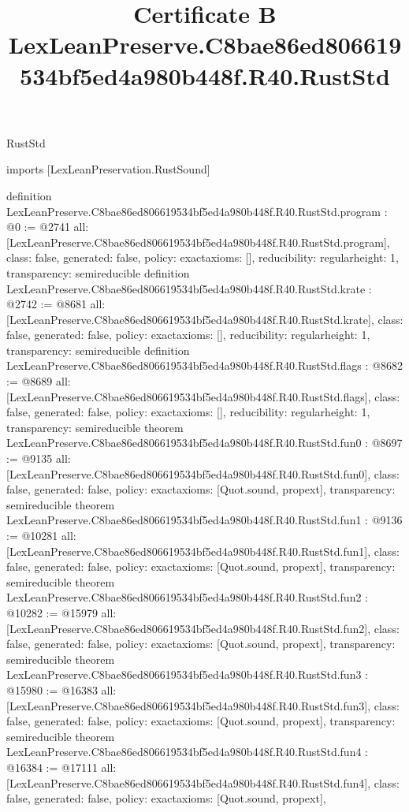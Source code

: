 \begin{lexlean}{RustStd}
\title{Certificate B LexLeanPreserve.C8bae86ed806619534bf5ed4a980b448f.R40.RustStd}
\begin{coremodule}
imports [LexLeanPreservation.RustSound]

definition LexLeanPreserve.C8bae86ed806619534bf5ed4a980b448f.R40.RustStd.program : @0 := @2741 {
  all: [LexLeanPreserve.C8bae86ed806619534bf5ed4a980b448f.R40.RustStd.program],
  class: false,
  generated: false,
  policy: exact{axioms: []},
  reducibility: regular{height: 1},
  transparency: semireducible
}
definition LexLeanPreserve.C8bae86ed806619534bf5ed4a980b448f.R40.RustStd.krate : @2742 := @8681 {
  all: [LexLeanPreserve.C8bae86ed806619534bf5ed4a980b448f.R40.RustStd.krate],
  class: false,
  generated: false,
  policy: exact{axioms: []},
  reducibility: regular{height: 1},
  transparency: semireducible
}
definition LexLeanPreserve.C8bae86ed806619534bf5ed4a980b448f.R40.RustStd.flags : @8682 := @8689 {
  all: [LexLeanPreserve.C8bae86ed806619534bf5ed4a980b448f.R40.RustStd.flags],
  class: false,
  generated: false,
  policy: exact{axioms: []},
  reducibility: regular{height: 1},
  transparency: semireducible
}
theorem LexLeanPreserve.C8bae86ed806619534bf5ed4a980b448f.R40.RustStd.fun0 : @8697 := @9135 {
  all: [LexLeanPreserve.C8bae86ed806619534bf5ed4a980b448f.R40.RustStd.fun0],
  class: false,
  generated: false,
  policy: exact{axioms: [Quot.sound, propext]},
  transparency: semireducible
}
theorem LexLeanPreserve.C8bae86ed806619534bf5ed4a980b448f.R40.RustStd.fun1 : @9136 := @10281 {
  all: [LexLeanPreserve.C8bae86ed806619534bf5ed4a980b448f.R40.RustStd.fun1],
  class: false,
  generated: false,
  policy: exact{axioms: [Quot.sound, propext]},
  transparency: semireducible
}
theorem LexLeanPreserve.C8bae86ed806619534bf5ed4a980b448f.R40.RustStd.fun2 : @10282 := @15979 {
  all: [LexLeanPreserve.C8bae86ed806619534bf5ed4a980b448f.R40.RustStd.fun2],
  class: false,
  generated: false,
  policy: exact{axioms: [Quot.sound, propext]},
  transparency: semireducible
}
theorem LexLeanPreserve.C8bae86ed806619534bf5ed4a980b448f.R40.RustStd.fun3 : @15980 := @16383 {
  all: [LexLeanPreserve.C8bae86ed806619534bf5ed4a980b448f.R40.RustStd.fun3],
  class: false,
  generated: false,
  policy: exact{axioms: [Quot.sound, propext]},
  transparency: semireducible
}
theorem LexLeanPreserve.C8bae86ed806619534bf5ed4a980b448f.R40.RustStd.fun4 : @16384 := @17111 {
  all: [LexLeanPreserve.C8bae86ed806619534bf5ed4a980b448f.R40.RustStd.fun4],
  class: false,
  generated: false,
  policy: exact{axioms: [Quot.sound, propext]},
}
\end{coremodule}
\end{lexlean}
